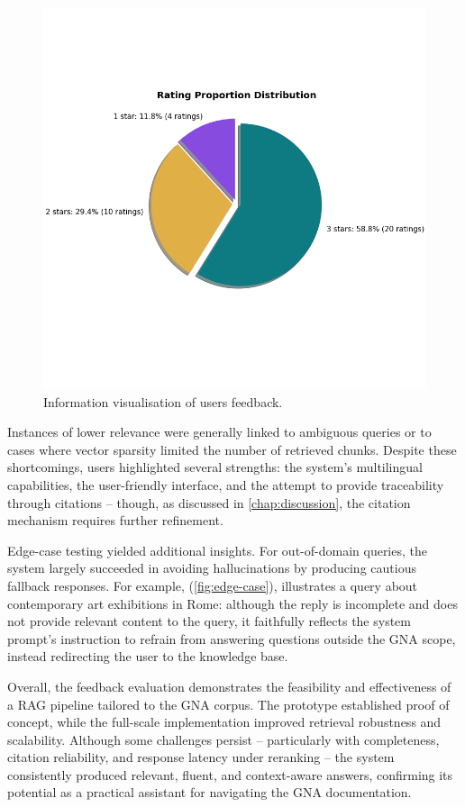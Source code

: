 \begin{spacing}{1.5}
\begin{figure}[H]
  \centering
  \includegraphics[width=\textwidth]{images/rating_proportions.png} 
  \caption{Information visualisation of users feedback.}
  \label{fig:ratings_}
\end{figure}

Instances of lower relevance were generally linked to ambiguous queries or to cases where vector sparsity limited the number of retrieved chunks. Despite these shortcomings, users highlighted several strengths: the system’s multilingual capabilities, the user-friendly interface, and the attempt to provide traceability through citations -- though, as discussed in \autoref{chap:discussion}, the citation mechanism requires further refinement.

Edge-case testing yielded additional insights. For out-of-domain queries, the system largely succeeded in avoiding hallucinations by producing cautious fallback responses. For example, (\autoref{fig:edge-case}), illustrates a query about contemporary art exhibitions in Rome: although the reply is incomplete and does not provide relevant content to the query, it faithfully reflects the system prompt’s instruction to refrain from answering questions outside the GNA scope, instead redirecting the user to the knowledge base.

Overall, the feedback evaluation demonstrates the feasibility and effectiveness of a RAG pipeline tailored to the GNA corpus. The prototype established proof of concept, while the full-scale implementation improved retrieval robustness and scalability. Although some challenges persist -- particularly with completeness, citation reliability, and response latency under reranking -- the system consistently produced relevant, fluent, and context-aware answers, confirming its potential as a practical assistant for navigating the GNA documentation.


\end{spacing}
